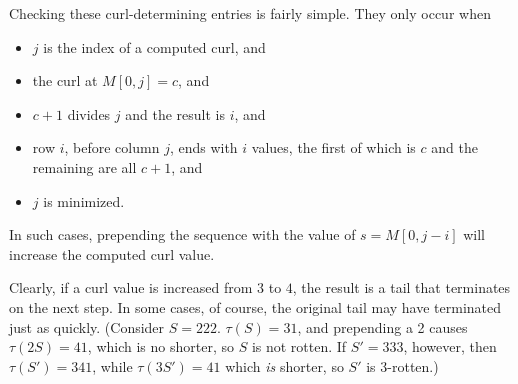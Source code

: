 \documentclass[11pt]{article}
\def\emph#1{{\em #1\/}}
\def\term#1{\emph{#1}}
\def\ni{\noindent}
\def\tail#1{{\tau(#1)}}
\begin{document}
Checking these curl-determining entries is fairly simple.  They only occur
when
\begin{itemize}
\item $j$ is the index of a computed curl, and
\item the curl at $M[0,j]=c$, and
\item $c+1$ divides $j$ and the result is $i$, and
\item row $i$, before column $j$, ends with $i$ values, the first of which is $c$ and the
remaining are all $c+1$, and
\item $j$ is minimized.
\end{itemize}
\ni In such cases, prepending the sequence with the value of $s=M[0,j-i]$
will increase the computed curl value.

Clearly, if a curl value is increased from $3$ to $4$, the result is a
tail that terminates on the next step.  In some cases, of course, the original
tail may have terminated just as quickly. (Consider $S=222$.  $\tail{S}=31$,
and prepending a 2 causes $\tail{2S}=41$, which is no shorter, so $S$ is not
rotten.  If $S'=333$, however, then $\tail{S'}=341$, while $\tail{3S'}=41$ which
\term{is} shorter, so $S'$ is 3-rotten.)
\end{document}
